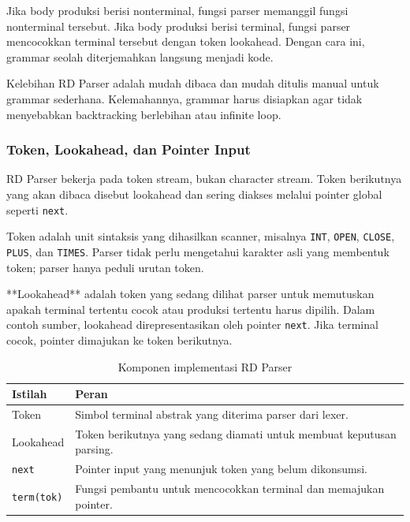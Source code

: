 Jika body produksi berisi nonterminal, fungsi parser memanggil fungsi nonterminal tersebut. Jika body produksi berisi terminal, fungsi parser mencocokkan terminal tersebut dengan token lookahead. Dengan cara ini, grammar seolah diterjemahkan langsung menjadi kode.

Kelebihan RD Parser adalah mudah dibaca dan mudah ditulis manual untuk grammar sederhana. Kelemahannya, grammar harus disiapkan agar tidak menyebabkan backtracking berlebihan atau infinite loop.

\subsubsection{Token, Lookahead, dan Pointer Input}

\begin{jawab}
RD Parser bekerja pada token stream, bukan character stream. Token berikutnya yang akan dibaca disebut lookahead dan sering diakses melalui pointer global seperti \texttt{next}.
\end{jawab}

Token adalah unit sintaksis yang dihasilkan scanner, misalnya \texttt{INT}, \texttt{OPEN}, \texttt{CLOSE}, \texttt{PLUS}, dan \texttt{TIMES}. Parser tidak perlu mengetahui karakter asli yang membentuk token; parser hanya peduli urutan token.

**Lookahead** adalah token yang sedang dilihat parser untuk memutuskan apakah terminal tertentu cocok atau produksi tertentu harus dipilih. Dalam contoh sumber, lookahead direpresentasikan oleh pointer \texttt{next}. Jika terminal cocok, pointer dimajukan ke token berikutnya.

\begin{table}[H]
\centering
\begin{tabularx}{\textwidth}{|L{0.24\textwidth}|X|}
\hline
\textbf{Istilah} & \textbf{Peran} \\
\hline
Token & Simbol terminal abstrak yang diterima parser dari lexer. \\
\hline
Lookahead & Token berikutnya yang sedang diamati untuk membuat keputusan parsing. \\
\hline
\texttt{next} & Pointer input yang menunjuk token yang belum dikonsumsi. \\
\hline
\texttt{term(tok)} & Fungsi pembantu untuk mencocokkan terminal dan memajukan pointer. \\
\hline
\end{tabularx}
\caption{Komponen implementasi RD Parser}
\label{tab:komponen-rd-parser}
\end{table}

